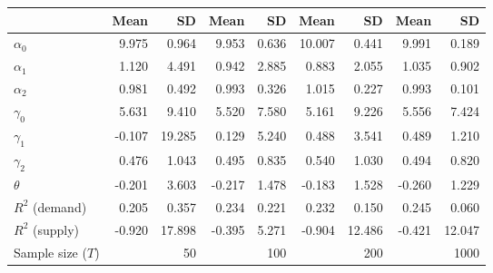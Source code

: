 
\begin{tabular}[t]{lrrrrrrrr}
\toprule
  & Mean & SD & Mean  & SD  & Mean   & SD   & Mean    & SD   \\
\midrule
$\alpha_{0}$ & 9.975 & 0.964 & 9.953 & 0.636 & 10.007 & 0.441 & 9.991 & 0.189\\
$\alpha_{1}$ & 1.120 & 4.491 & 0.942 & 2.885 & 0.883 & 2.055 & 1.035 & 0.902\\
$\alpha_{2}$ & 0.981 & 0.492 & 0.993 & 0.326 & 1.015 & 0.227 & 0.993 & 0.101\\
$\gamma_{0}$ & 5.631 & 9.410 & 5.520 & 7.580 & 5.161 & 9.226 & 5.556 & 7.424\\
$\gamma_{1}$ & -0.107 & 19.285 & 0.129 & 5.240 & 0.488 & 3.541 & 0.489 & 1.210\\
$\gamma_{2}$ & 0.476 & 1.043 & 0.495 & 0.835 & 0.540 & 1.030 & 0.494 & 0.820\\
$\theta$ & -0.201 & 3.603 & -0.217 & 1.478 & -0.183 & 1.528 & -0.260 & 1.229\\
$R^{2}$ (demand) & 0.205 & 0.357 & 0.234 & 0.221 & 0.232 & 0.150 & 0.245 & 0.060\\
$R^{2}$ (supply) & -0.920 & 17.898 & -0.395 & 5.271 & -0.904 & 12.486 & -0.421 & 12.047\\
Sample size ($T$) &  & 50 &  & 100 &  & 200 &  & 1000\\
\bottomrule
\end{tabular}
